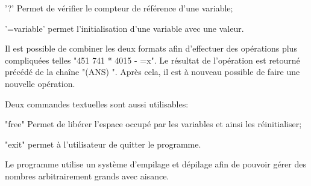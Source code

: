 \documentclass[]{report}
\begin{document}
\begin{normalsize}
		\begin{description}[noitemsep]
			\item \hspace{4mm}'?' Permet de vérifier le compteur de référence d'une variable;
			\item \hspace{4mm}'=variable' permet l'initialisation d'une variable avec une valeur.
		\end{description}
		\par Il est possible de combiner les deux formats afin d'effectuer des opérations plus compliquées telles "451 741 * 4015 - =x". Le résultat de l'opération est retourné précédé de la chaîne "(ANS) ". Après cela, il est à nouveau possible de faire une nouvelle opération.
		\vspace{4mm}
		\par Deux commandes textuelles sont aussi utilisables:
		\begin{description}[noitemsep]
			\item \hspace{4mm}"free" Permet de libérer l'espace occupé par les variables et ainsi les réinitialiser;
			\item \hspace{4mm}"exit" permet à l'utilisateur de quitter le programme.
		\end{description}
	\par Le programme utilise un système d'empilage et dépilage afin de pouvoir gérer des nombres arbitrairement grands avec aisance.
		\vspace{4mm}
	\end{normalsize}
	\newpage
\end{document}
